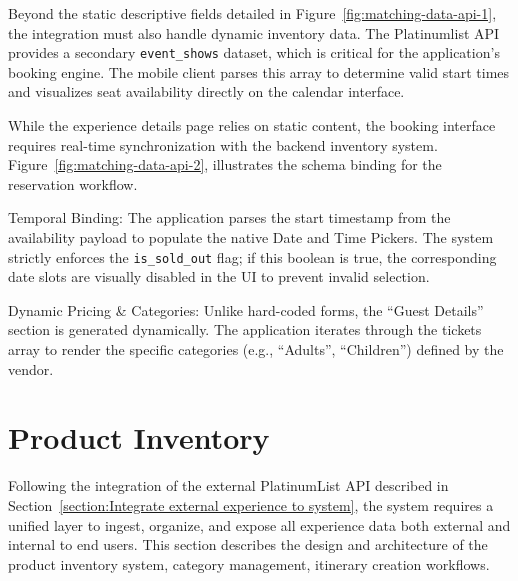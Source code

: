 Beyond the static descriptive fields detailed in Figure~\ref{fig:matching-data-api-1}, the integration must also handle dynamic inventory data. The Platinumlist API provides a secondary \texttt{event\_shows} dataset, which is critical for the application's booking engine. The mobile client parses this array to determine valid start times and visualizes seat availability directly on the calendar interface.


While the experience details page relies on static content, the booking interface requires real-time synchronization with the backend inventory system. Figure~\ref{fig:matching-data-api-2}, illustrates the schema binding for the reservation workflow.

Temporal Binding: The application parses the start timestamp from the availability payload to populate the native Date and Time Pickers. The system strictly enforces the \texttt{is\_sold\_out} flag; if this boolean is true, the corresponding date slots are visually disabled in the UI to prevent invalid selection.

Dynamic Pricing \& Categories: Unlike hard-coded forms, the ``Guest Details'' section is generated dynamically. The application iterates through the tickets array to render the specific categories (e.g., ``Adults'', ``Children'') defined by the vendor.


\section{Product Inventory}
\label{section:Product Inventory}
Following the integration of the external PlatinumList API described in Section~\ref{section:Integrate external experience to system}, the system requires a unified layer to ingest, organize, and expose all experience data both external and internal to end users. This section describes the design and architecture of the product inventory system, category management, itinerary creation workflows.

